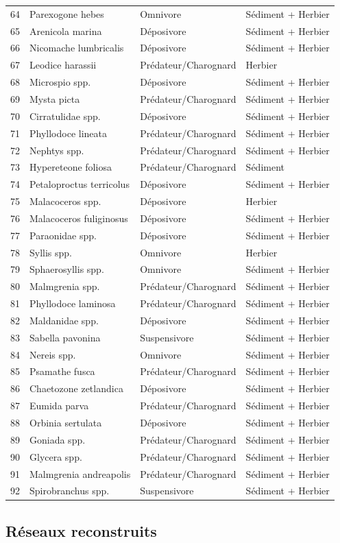 \documentclass[12pt,]{article}
\begin{document}
{\begin{longtable}[]{@{}rlll@{}}
64 & Parexogone hebes & Omnivore & Sédiment + Herbier\tabularnewline
65 & Arenicola marina & Déposivore & Sédiment + Herbier\tabularnewline
66 & Nicomache lumbricalis & Déposivore & Sédiment +
Herbier\tabularnewline
67 & Leodice harassii & Prédateur/Charognard & Herbier\tabularnewline
68 & Microspio spp. & Déposivore & Sédiment + Herbier\tabularnewline
69 & Mysta picta & Prédateur/Charognard & Sédiment +
Herbier\tabularnewline
70 & Cirratulidae spp. & Déposivore & Sédiment + Herbier\tabularnewline
71 & Phyllodoce lineata & Prédateur/Charognard & Sédiment +
Herbier\tabularnewline
72 & Nephtys spp. & Prédateur/Charognard & Sédiment +
Herbier\tabularnewline
73 & Hypereteone foliosa & Prédateur/Charognard &
Sédiment\tabularnewline
74 & Petaloproctus terricolus & Déposivore & Sédiment +
Herbier\tabularnewline
75 & Malacoceros spp. & Déposivore & Herbier\tabularnewline
76 & Malacoceros fuliginosus & Déposivore & Sédiment +
Herbier\tabularnewline
77 & Paraonidae spp. & Déposivore & Sédiment + Herbier\tabularnewline
78 & Syllis spp. & Omnivore & Herbier\tabularnewline
79 & Sphaerosyllis spp. & Omnivore & Sédiment + Herbier\tabularnewline
80 & Malmgrenia spp. & Prédateur/Charognard & Sédiment +
Herbier\tabularnewline
81 & Phyllodoce laminosa & Prédateur/Charognard & Sédiment +
Herbier\tabularnewline
82 & Maldanidae spp. & Déposivore & Sédiment + Herbier\tabularnewline
83 & Sabella pavonina & Suspensivore & Sédiment + Herbier\tabularnewline
84 & Nereis spp. & Omnivore & Sédiment + Herbier\tabularnewline
85 & Psamathe fusca & Prédateur/Charognard & Sédiment +
Herbier\tabularnewline
86 & Chaetozone zetlandica & Déposivore & Sédiment +
Herbier\tabularnewline
87 & Eumida parva & Prédateur/Charognard & Sédiment +
Herbier\tabularnewline
88 & Orbinia sertulata & Déposivore & Sédiment + Herbier\tabularnewline
89 & Goniada spp. & Prédateur/Charognard & Sédiment +
Herbier\tabularnewline
90 & Glycera spp. & Prédateur/Charognard & Sédiment +
Herbier\tabularnewline
91 & Malmgrenia andreapolis & Prédateur/Charognard & Sédiment +
Herbier\tabularnewline
92 & Spirobranchus spp. & Suspensivore & Sédiment +
Herbier\tabularnewline
\bottomrule
\end{longtable}}\FloatBarrier


\hypertarget{ruxe9seaux-reconstruits-1}{%
\subsection{Réseaux reconstruits}\label{ruxe9seaux-reconstruits-1}}
\end{document}
